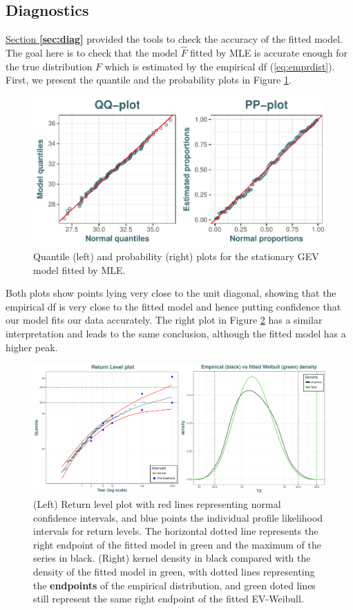 \subsection{Diagnostics}

\hyperref[sec:diag]{Section \textbf{\ref{sec:diag}}} provided the tools to check the accuracy of the fitted model. The goal here is to check that the
model $\hat{F}$ fitted by MLE is accurate enough for the true distribution $F$ which is estimated by the empirical df
(\ref{eq:emprdist}). First, we present the quantile and the probability plots in Figure \ref{fig:ppqqplot}.

\begin{figure}[!htb]
	\centering	\includegraphics[width=.7\linewidth]{pp_qqplot.pdf}\caption{Quantile (left) and probability (right) plots for the stationary GEV model fitted by MLE.}\label{fig:ppqqplot}
\end{figure}

Both plots show points lying very close to the unit diagonal, showing that the empirical df is very close to the fitted model and hence putting confidence that our model fits our data accurately.
The right plot in Figure \ref{fig:rl_empdes} has a similar interpretation and leads to the same conclusion, although the fitted model has a higher peak.

\begin{figure}[!htb]
	\centering	\includegraphics[width=.75\linewidth]{rl_empdes.pdf}\caption{(Left) Return level plot with red lines representing normal confidence intervals, and blue points the individual profile likelihood intervals for return levels. The horizontal dotted line represents the right endpoint of the	fitted model in green and the maximum of the series in black. (Right) kernel density in black compared with the density of the fitted model in green, with dotted lines representing the \textbf{endpoints} of the empirical distribution, and green doted lines still represent the same right endpoint of the fitted EV-Weibull.}\label{fig:rl_empdes}
\end{figure}


